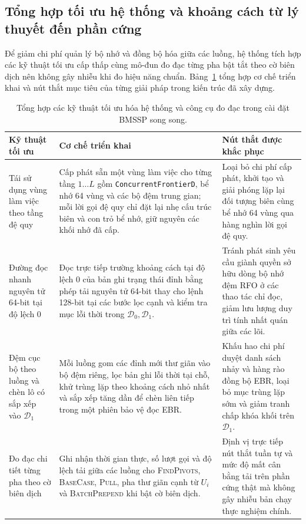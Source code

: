 \subsection{Tổng hợp tối ưu hệ thống và khoảng cách từ lý thuyết đến phần cứng}\label{subsec:c2-limits}

Để giảm chi phí quản lý bộ nhớ và đồng bộ hóa giữa các luồng, hệ thống tích hợp các kỹ thuật tối ưu cấp thấp cùng mô-đun đo đạc từng pha bật tắt theo cờ biên dịch nên không gây nhiễu khi đo hiệu năng chuẩn. Bảng~\ref{tab:optimizations} tổng hợp cơ chế triển khai và nút thắt mục tiêu của từng giải pháp trong kiến trúc đã xây dựng.

\begin{table}[H]
\centering
{\small\setlength{\baselineskip}{14pt}
\begin{tabularx}{\textwidth}{>{\raggedright\arraybackslash}p{3.5cm} >{\raggedright\arraybackslash}X >{\raggedright\arraybackslash}X}
\toprule
\textbf{Kỹ thuật tối ưu} & \textbf{Cơ chế triển khai} & \textbf{Nút thắt được khắc phục} \\
\midrule
Tái sử dụng vùng làm việc theo tầng đệ quy &
Cấp phát sẵn một vùng làm việc cho từng tầng $1 \dots L$ gồm \texttt{Concurrent\allowbreak FrontierD}, bể nhớ 64 vùng và các bộ đệm trung gian; mỗi lời gọi đệ quy chỉ đặt lại nhẹ cấu trúc biên và con trỏ bể nhớ, giữ nguyên các khối nhớ đã cấp. &
Loại bỏ chi phí cấp phát, khởi tạo và giải phóng lặp lại đối tượng biên cùng bể nhớ 64 vùng qua hàng nghìn lời gọi đệ quy. \\
\addlinespace[5pt]
Đường đọc nhanh nguyên tử 64-bit tại độ lệch 0 &
Đọc trực tiếp trường khoảng cách tại độ lệch 0 của bản ghi trạng thái đỉnh bằng phép tải nguyên tử 64-bit thay cho lệnh 128-bit tại các bước lọc cạnh và kiểm tra mục lỗi thời trong $\mathcal{D}_0, \mathcal{D}_1$. &
Tránh phát sinh yêu cầu giành quyền sở hữu dòng bộ nhớ đệm RFO ở các thao tác chỉ đọc, giảm lưu lượng duy trì tính nhất quán giữa các lõi. \\
\addlinespace[5pt]
Đệm cục bộ theo luồng và chèn lô có sắp xếp vào $\mathcal{D}_1$ &
Mỗi luồng gom các đỉnh mới thư giãn vào bộ đệm riêng, lọc bản ghi lỗi thời tại chỗ, khử trùng lặp theo khoảng cách nhỏ nhất và sắp xếp tăng dần để chèn liên tiếp trong một phiên bảo vệ đọc EBR. &
Khấu hao chi phí duyệt danh sách nhảy và hàng rào đồng bộ EBR, loại bỏ mục trùng lặp sớm và giảm tranh chấp khóa khối trên $\mathcal{D}_1$. \\
\addlinespace[5pt]
Đo đạc chi tiết từng pha theo cờ biên dịch &
Ghi nhận thời gian thực, số lượt gọi và độ lệch tải giữa các luồng cho \textsc{FindPivots}, \textsc{BaseCase}, \textsc{Pull}, pha thư giãn cạnh từ $U_i$ và \textsc{BatchPrepend} khi bật cờ biên dịch. &
Định vị trực tiếp nút thắt tuần tự và mức độ mất cân bằng tải trên phần cứng thật mà không gây nhiễu bản chạy thực nghiệm chính. \\
\bottomrule
\end{tabularx}
}
\caption{Tổng hợp các kỹ thuật tối ưu hóa hệ thống và công cụ đo đạc trong cài đặt BMSSP song song.}
\label{tab:optimizations}
\end{table}

